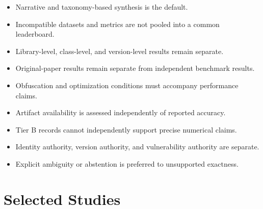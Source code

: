\begin{itemize}
  \item Narrative and taxonomy-based synthesis is the default.
  \item Incompatible datasets and metrics are not pooled into a common
    leaderboard.
  \item Library-level, class-level, and version-level results remain separate.
  \item Original-paper results remain separate from independent benchmark
    results.
  \item Obfuscation and optimization conditions must accompany performance
    claims.
  \item Artifact availability is assessed independently of reported accuracy.
  \item Tier B records cannot independently support precise numerical claims.
  \item Identity authority, version authority, and vulnerability authority are
    separate.
  \item Explicit ambiguity or abstention is preferred to unsupported exactness.
\end{itemize}

\section{Selected Studies}

